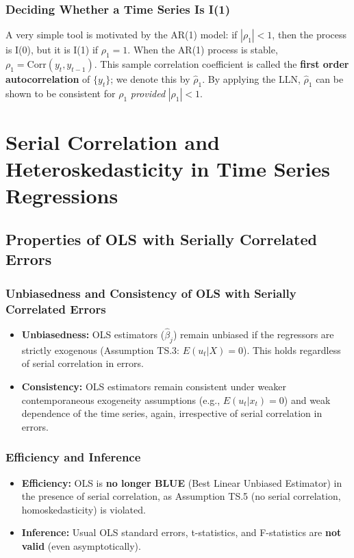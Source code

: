 \documentclass[a4paper, 10pt]{article}
\theoremstyle{definition}	%
\begin{document}
\subsubsection{Deciding Whether a Time Series Is I(1)}
A very simple tool is motivated by the AR(1) model: if \( |\rho_1| < 1 \), then the process is I(0), but it is I(1) if \( \rho_1 = 1 \). When the AR(1) process is stable, \( \rho_1 = \text{Corr}(y_t, y_{t-1}) \). This sample correlation coefficient is called the \textbf{first order autocorrelation} of \( \{y_t\} \); we denote this by \( \hat{\rho}_1 \). By applying the LLN, \( \hat{\rho}_1 \) can be shown to be consistent for \( \rho_1 \) \textit{provided} \( |\rho_1| < 1 \).

\newpage
\section{Serial Correlation and Heteroskedasticity in Time Series Regressions}
\setcounter{equation}{0}
\setcounter{theorem}{0}
\setcounter{assumption}{0}

\subsection{Properties of OLS with Serially Correlated Errors}

\subsubsection{Unbiasedness and Consistency of OLS with Serially Correlated Errors}
\begin{itemize}
    \item \textbf{Unbiasedness:} OLS estimators (\(\hat{\beta}_j\)) remain unbiased if the regressors are strictly exogenous (Assumption TS.3: \(E(u_t|X)=0\)). This holds regardless of serial correlation in errors.
    \item \textbf{Consistency:} OLS estimators remain consistent under weaker contemporaneous exogeneity assumptions (e.g., \(E(u_t|x_t)=0\)) and weak dependence of the time series, again, irrespective of serial correlation in errors.
\end{itemize}

\subsubsection{Efficiency and Inference}
\begin{itemize}
    \item \textbf{Efficiency:} OLS is \textbf{no longer BLUE} (Best Linear Unbiased Estimator) in the presence of serial correlation, as Assumption TS.5 (no serial correlation, homoskedasticity) is violated.
    \item \textbf{Inference:} Usual OLS standard errors, t-statistics, and F-statistics are \textbf{not valid} (even asymptotically).
\end{itemize}
\end{document}
